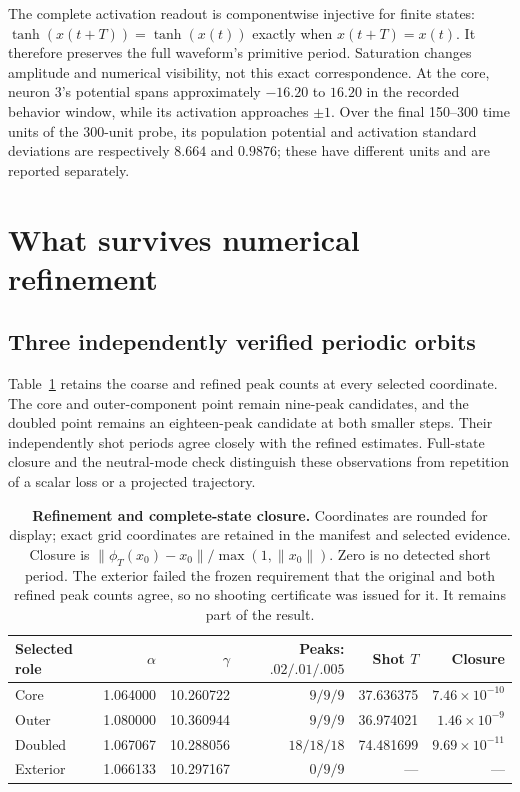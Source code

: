 \documentclass[11pt,letterpaper]{article}
\begin{document}
The complete activation readout is componentwise injective for finite states:
$\tanh(x(t+T))=\tanh(x(t))$ exactly when $x(t+T)=x(t)$. It therefore preserves the full waveform's primitive period. Saturation changes amplitude and numerical visibility, not this exact correspondence. At the core, neuron 3's potential spans approximately $-16.20$ to $16.20$ in the recorded behavior window, while its activation approaches $\pm1$. Over the final 150--300 time units of the 300-unit probe, its population potential and activation standard deviations are respectively $8.664$ and $0.9876$; these have different units and are reported separately.

\section{What survives numerical refinement}
\subsection{Three independently verified periodic orbits}
Table~\ref{tab:refinement} retains the coarse and refined peak counts at every selected coordinate. The core and outer-component point remain nine-peak candidates, and the doubled point remains an eighteen-peak candidate at both smaller steps. Their independently shot periods agree closely with the refined estimates. Full-state closure and the neutral-mode check distinguish these observations from repetition of a scalar loss or a projected trajectory.

\begin{table}[H]
\centering\small
\setlength{\tabcolsep}{4.5pt}
\begin{tabular}{lrrrrr}
\toprule
Selected role & $\alpha$ & $\gamma$ & Peaks: $.02/.01/.005$ & Shot $T$ & Closure\\
\midrule
Core & 1.064000 & 10.260722 & $9/9/9$ & 37.636375 & $7.46\!\times\!10^{-10}$\\
Outer & 1.080000 & 10.360944 & $9/9/9$ & 36.974021 & $1.46\!\times\!10^{-9}$\\
Doubled & 1.067067 & 10.288056 & $18/18/18$ & 74.481699 & $9.69\!\times\!10^{-11}$\\
Exterior & 1.066133 & 10.297167 & $0/9/9$ & --- & ---\\
\bottomrule
\end{tabular}
\caption{\textbf{Refinement and complete-state closure.} Coordinates are rounded for display; exact grid coordinates are retained in the manifest and selected evidence. Closure is $\|\phi_T(x_0)-x_0\|/\max(1,\|x_0\|)$. Zero is no detected short period. The exterior failed the frozen requirement that the original and both refined peak counts agree, so no shooting certificate was issued for it. It remains part of the result.}
\label{tab:refinement}
\end{table}
\end{document}

